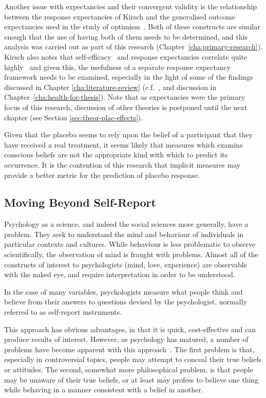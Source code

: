 Another issue with expectancies and their convergent validity is the relationship between the response expectancies of Kirsch  and the generalised outcome expectancies used in the study of optimism~\cite{Carver2010}. Both of these constructs are similar enough that the use of having both of them needs to be determined, and this analysis was carried out as part of this research (Chapter~\ref{cha:primary-research}). Kirsch also notes that self-efficacy~\cite{Bandura1977} and response expectancies correlate quite highly~\cite{Kirsch1985} and given this, the usefulness of a separate response expectancy framework needs to be examined, especially in the light of some of the findings discussed in Chapter \ref{cha:literature-review} (c.f.~\cite{Geers2005,Hyland2007}, and discussion in Chapter~\ref{cha:health-for-thesis}). Note that as expectancies were the primary focus of this research, discussion of other theories is postponed until the next chapter (see Section \ref{sec:theor-plac-effects}). 


Given that the placebo seems to rely upon the belief of a participant that they have received a real treatment, it seems likely that measures which examine conscious beliefs are not the appropriate kind with which to predict its occurrence. It is the contention of this research that implicit measures may provide a better metric for the prediction of placebo response. 

\subsection{Moving Beyond Self-Report}
\label{sec:implicit-measures}

Psychology as a science, and indeed the social sciences more generally, have a problem. They seek to understand the mind and behaviour of individuals in particular contexts and cultures. While behaviour is less problematic to observe scientifically, the observation of mind is fraught with problems. Almost all of the constructs of interest to psychologists (mind, love, experience) are observable with the naked eye, and require interpretation in order to be understood. 

In the case of many variables, psychologists measure what people think and believe from their answers to questions devised by the psychologist, normally referred to as self-report instruments. 

This approach has obvious advantages, in that it is quick, cost-effective and can produce results of interest. However, as psychology has matured, a number of problems have become apparent with this approach~\cite{Nisbett1977}.  The first problem is that, especially in controversial topics, people may attempt to conceal their true beliefs or attitudes. The second, somewhat more philosophical problem, is that people may be unaware of their true beliefs, or at least may profess to believe one thing while behaving in a manner consistent with a belief in another. 

